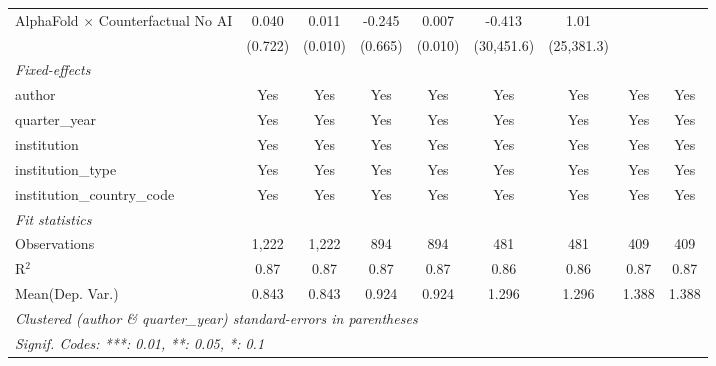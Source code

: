 \begin{tabular}{lcccccccc}
   AlphaFold $\times$ Counterfactual No AI  & 0.040         & 0.011          & -0.245        & 0.007          & -0.413        & 1.01           &              &   \\   
                                            & (0.722)       & (0.010)        & (0.665)       & (0.010)        & (30,451.6)    & (25,381.3)     &              &   \\   
   \midrule
   \emph{Fixed-effects}\\
   author                                   & Yes           & Yes            & Yes           & Yes            & Yes           & Yes            & Yes          & Yes\\  
   quarter\_year                            & Yes           & Yes            & Yes           & Yes            & Yes           & Yes            & Yes          & Yes\\  
   institution                              & Yes           & Yes            & Yes           & Yes            & Yes           & Yes            & Yes          & Yes\\  
   institution\_type                        & Yes           & Yes            & Yes           & Yes            & Yes           & Yes            & Yes          & Yes\\  
   institution\_country\_code               & Yes           & Yes            & Yes           & Yes            & Yes           & Yes            & Yes          & Yes\\  
   \midrule
   \emph{Fit statistics}\\
   Observations                             & 1,222         & 1,222          & 894           & 894            & 481           & 481            & 409          & 409\\  
   R$^2$                                    & 0.87          & 0.87           & 0.87          & 0.87           & 0.86          & 0.86           & 0.87         & 0.87\\  
Mean(Dep. Var.) & 0.843 & 0.843 & 0.924 & 0.924 & 1.296 & 1.296 & 1.388 & 1.388 \\
   \midrule \midrule
   \multicolumn{9}{l}{\emph{Clustered (author \& quarter\_year) standard-errors in parentheses}}\\
   \multicolumn{9}{l}{\emph{Signif. Codes: ***: 0.01, **: 0.05, *: 0.1}}\\
\end{tabular}
\par\endgroup
